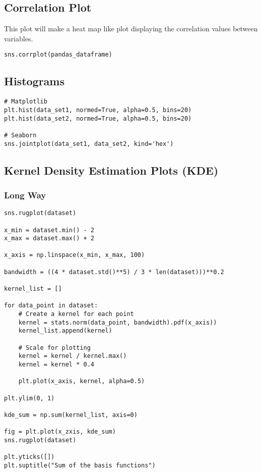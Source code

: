 \subsection{Correlation Plot}
This plot will make a heat map like plot displaying the correlation values
between variables.
\begin{lstlisting}
sns.corrplot(pandas_dataframe)
\end{lstlisting}

\subsection{Histograms}

\begin{lstlisting}
# Matplotlib
plt.hist(data_set1, normed=True, alpha=0.5, bins=20)
plt.hist(data_set2, normed=True, alpha=0.5, bins=20)

# Seaborn
sns.jointplot(data_set1, data_set2, kind='hex')
\end{lstlisting}

\subsection{Kernel Density Estimation Plots (KDE)}

\subsubsection{Long Way}

\begin{lstlisting}
sns.rugplot(dataset)

x_min = dataset.min() - 2
x_max = dataset.max() + 2

x_axis = np.linspace(x_min, x_max, 100)

bandwidth = ((4 * dataset.std()**5) / 3 * len(dataset)))**0.2

kernel_list = []

for data_point in dataset:
    # Create a kernel for each point
    kernel = stats.norm(data_point, bandwidth).pdf(x_axis))
    kernel_list.append(kernel)

    # Scale for plotting
    kernel = kernel / kernel.max()
    kernel = kernel * 0.4

    plt.plot(x_axis, kernel, alpha=0.5)

plt.ylim(0, 1)

kde_sum = np.sum(kernel_list, axis=0)

fig = plt.plot(x_zxis, kde_sum)
sns.rugplot(dataset)

plt.yticks([])
plt.suptitle("Sum of the basis functions")
\end{lstlisting}

